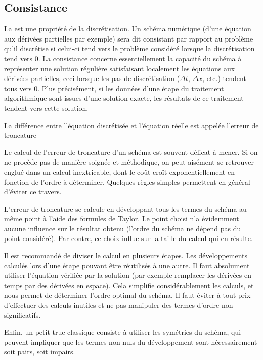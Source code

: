 \medskip
\subsection{Consistance}
La  est une propriété de la discrétisation. Un schéma numérique (d'une équation aux dérivées partielles par exemple) sera dit consistant par rapport au problème qu'il discrétise si celui-ci tend vers le problème considéré lorsque la discrétisation tend vers 0. La consistance concerne essentiellement la capacité du schéma à représenter une solution régulière satisfaisant localement les équations aux dérivées partielles, ceci lorsque les pas de discrétisation ($\Delta t$, $\Delta x$, etc.) tendent tous vers 0. Plus précisément, si les données d'une étape du traitement algorithmique sont issues d'une solution exacte, les résultats de ce traitement tendent vers cette solution.

La différence entre l'équation discrétisée et l'équation réelle est appelée l'erreur de troncature

\medskip
{}

\begin{remarque}
Le calcul de l'erreur de troncature d'un schéma est souvent délicat à mener. Si on ne procède pas de manière soignée et méthodique, on peut aisément se retrouver englué dans un calcul inextricable, dont le coût croît exponentiellement en fonction de l'ordre à déterminer. 
Quelques règles simples permettent en général d'éviter ce travers. 

L'erreur de troncature se calcule en développant tous les termes du schéma au même point à l'aide des formules de Taylor. Le point choisi n'a évidemment aucune influence sur le résultat obtenu (l'ordre du schéma ne dépend pas du point considéré). Par contre, ce choix influe sur la taille du calcul qui en résulte.

Il est recommandé de diviser le calcul en plusieurs étapes. Les développements calculés lors d'une étape pouvant être réutilisés à une autre. Il faut absolument utiliser l'équation vérifiée par la solution (par exemple remplacer les dérivées en temps par des dérivées en espace). Cela simplifie considérablement les calculs, et nous permet de déterminer l'ordre optimal du schéma.
Il faut éviter à tout prix d'effectuer des calculs inutiles et ne pas manipuler des termes d'ordre non significatifs. 

Enfin, un petit truc classique consiste à utiliser les symétries du schéma, qui peuvent impliquer que les termes non nuls du développement sont nécessairement soit pairs, soit impairs.
\end{remarque}


